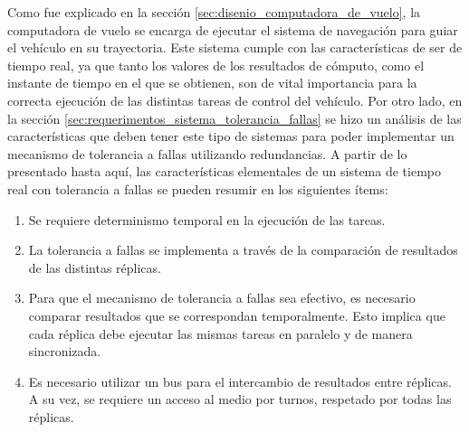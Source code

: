 
Como fue explicado en la sección \ref{sec:disenio_computadora_de_vuelo}, la computadora de vuelo se encarga de ejecutar el sistema de navegación para guiar el vehículo en su trayectoria. Este sistema cumple con las características de ser de tiempo real, ya que tanto los valores de los resultados de cómputo, como el instante de tiempo en el que se obtienen, son de vital importancia para la correcta ejecución de las distintas tareas de control del vehículo. 
Por otro lado, en la sección \ref{sec:requerimentos_sistema_tolerancia_fallas} se hizo un análisis de las características que deben tener este tipo de sistemas para poder implementar un mecanismo de tolerancia a fallas utilizando redundancias. A partir de lo presentado hasta aquí, las características elementales de un sistema de tiempo real con tolerancia a fallas se pueden resumir en los siguientes ítems:


\begin{enumerate}
    \item Se requiere determinismo temporal en la ejecución de las tareas.
    \item La tolerancia a fallas se implementa a través de la comparación de resultados de las distintas réplicas.
    \item Para que el mecanismo de tolerancia a fallas sea efectivo, es necesario comparar resultados que se correspondan temporalmente. Esto implica que cada réplica debe ejecutar las mismas tareas en paralelo y de manera sincronizada.
    \item Es necesario utilizar un bus para el intercambio de resultados entre réplicas. A su vez, se requiere un acceso al medio por turnos, respetado por todas las réplicas.
\end{enumerate}

